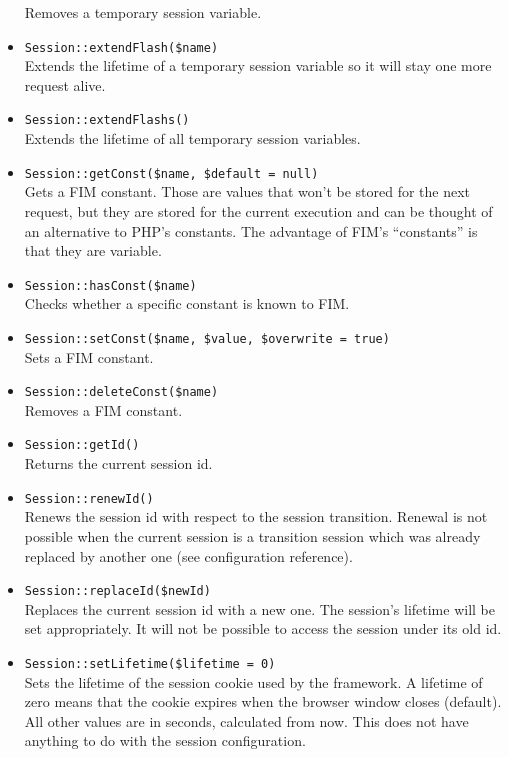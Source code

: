\documentclass{scrartcl}
\begin{document}
\begin{itemize}
            Removes a temporary session variable.
         \item \lstinline!Session::extendFlash($name)! \\
            Extends the lifetime of a temporary session variable so it will stay one more request alive.
         \item \lstinline!Session::extendFlashs()! \\
            Extends the lifetime of all temporary session variables.
         \item \lstinline!Session::getConst($name, $default = null)! \\
            Gets a FIM constant. Those are values that won't be stored for the next request, but they are stored for the current execution and can be thought of an alternative to PHP's constants. The advantage of FIM's ``constants'' is that they are variable.
         \item \lstinline!Session::hasConst($name)! \\
            Checks whether a specific constant is known to FIM.
         \item \lstinline!Session::setConst($name, $value, $overwrite = true)! \\
            Sets a FIM constant.
         \item \lstinline!Session::deleteConst($name)! \\
            Removes a FIM constant.
         \item \lstinline!Session::getId()! \\
            Returns the current session id.
         \item \lstinline!Session::renewId()! \\
            Renews the session id with respect to the session transition. Renewal is not possible when the current session is a transition session which was already replaced by another one (see configuration reference).
         \item \lstinline!Session::replaceId($newId)! \\
            Replaces the current session id with a new one. The session's lifetime will be set appropriately. It will not be possible to access the session under its old id.
         \item \lstinline!Session::setLifetime($lifetime = 0)! \\
            Sets the lifetime of the session cookie used by the framework. A lifetime of zero means that the cookie expires when the browser window closes (default). All other values are in seconds, calculated from now. This does not have anything to do with the session configuration.
      \end{itemize}
\end{document}
